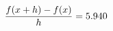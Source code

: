 \documentclass[preview]{standalone}
\begin{document}
\begin{align*}
\special{dvisvgm:raw <g id='unique000'>}\frac{f(x+h)-f(x)}{h} = 5.940\special{dvisvgm:raw </g>}
\end{align*}
\end{document}
